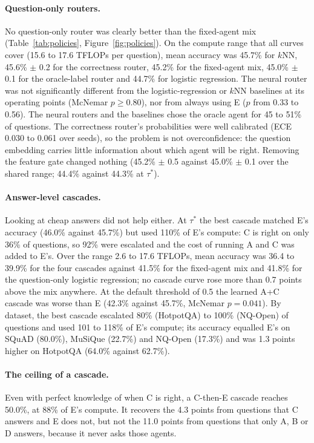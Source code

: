\documentclass[11pt,a4paper]{article}
\begin{document}
\paragraph{Question-only routers.} No question-only router was clearly better than the fixed-agent mix
(Table~\ref{tab:policies}, Figure~\ref{fig:policies}). On the compute range that all curves cover (15.6 to 17.6
TFLOPs per question), mean accuracy was 45.7\% for $k$NN, 45.6\% $\pm$ 0.2 for the correctness router, 45.2\% for
the fixed-agent mix, 45.0\% $\pm$ 0.1 for the oracle-label router and 44.7\% for logistic regression. The neural
router was not significantly different from the logistic-regression or $k$NN baselines at its operating points
(McNemar $p \ge 0.80$), nor from always using E ($p$ from 0.33 to 0.56). The neural routers and the baselines chose the oracle agent for 45 to
51\% of questions. The correctness router's probabilities were well calibrated (ECE 0.030 to 0.061 over seeds), so
the problem is not overconfidence: the question embedding carries little information about which agent will be
right. Removing the feature gate changed nothing (45.2\% $\pm$ 0.5 against 45.0\% $\pm$ 0.1 over the shared range;
44.4\% against 44.3\% at $\tau^*$).

\paragraph{Answer-level cascades.} Looking at cheap answers did not help either. At $\tau^*$ the best cascade
matched E's accuracy (46.0\% against 45.7\%) but used 110\% of E's compute: C is right on only 36\% of questions, so
92\% were escalated and the cost of running A and C was added to E's. Over the range 2.6 to 17.6 TFLOPs, mean accuracy
was 36.4 to 39.9\% for the four cascades against 41.5\% for the fixed-agent mix and 41.8\% for the question-only
logistic regression; no cascade curve rose more than 0.7 points above the mix anywhere. At the default threshold of
0.5 the learned A+C cascade was worse than E (42.3\% against 45.7\%, McNemar $p=0.041$). By dataset, the best cascade
escalated 80\% (HotpotQA) to 100\% (NQ-Open) of questions and used 101 to 118\% of E's compute; its accuracy equalled
E's on SQuAD (80.0\%), MuSiQue (22.7\%) and NQ-Open (17.3\%) and was 1.3 points higher on HotpotQA (64.0\% against
62.7\%).

\paragraph{The ceiling of a cascade.} Even with perfect knowledge of when C is right, a C-then-E cascade reaches
50.0\%, at 88\% of E's compute. It recovers the 4.3 points from questions that C answers and E does not, but not the
11.0 points from questions that only A, B or D answers, because it never asks those agents.
\end{document}
